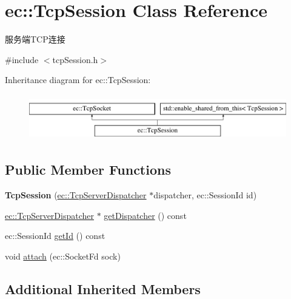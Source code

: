 \hypertarget{classec_1_1TcpSession}{\section{ec\-:\-:Tcp\-Session Class Reference}
\label{classec_1_1TcpSession}
}


服务端\-T\-C\-P连接  




{\ttfamily \#include $<$tcp\-Session.\-h$>$}

Inheritance diagram for ec\-:\-:Tcp\-Session\-:\begin{figure}[H]
\begin{center}
\leavevmode
\includegraphics[height=2.000000cm]{classec_1_1TcpSession}
\end{center}
\end{figure}
\subsection*{Public Member Functions}
\begin{DoxyCompactItemize}
\item 
\hypertarget{classec_1_1TcpSession_abfc38f6a02ca6dfce9474a9a1b9dc52d}{{\bfseries Tcp\-Session} (\hyperlink{classec_1_1TcpServerDispatcher}{ec\-::\-Tcp\-Server\-Dispatcher} $\ast$dispatcher, ec\-::\-Session\-Id id)}\label{classec_1_1TcpSession_abfc38f6a02ca6dfce9474a9a1b9dc52d}

\item 
\hyperlink{classec_1_1TcpServerDispatcher}{ec\-::\-Tcp\-Server\-Dispatcher} $\ast$ \hyperlink{classec_1_1TcpSession_af4ff735c6120233feccc3a1ca29bbf04}{get\-Dispatcher} () const 
\item 
ec\-::\-Session\-Id \hyperlink{classec_1_1TcpSession_af00a92d50517f1f26cbe8d23d07452be}{get\-Id} () const 
\item 
void \hyperlink{classec_1_1TcpSession_a098cb072909ba5452f47397a787311f4}{attach} (ec\-::\-Socket\-Fd sock)
\end{DoxyCompactItemize}
\subsection*{Additional Inherited Members}


